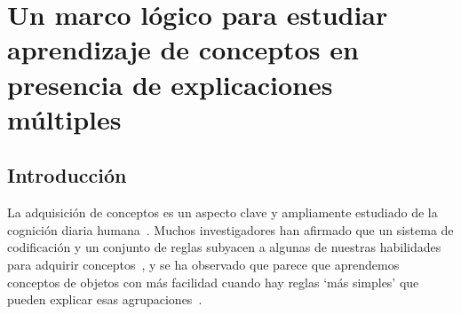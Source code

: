 

\chapter{Un marco lógico para estudiar aprendizaje de conceptos en presencia de explicaciones múltiples}\label{chapter:BRM}




\section{Introducción}


La adquisición de conceptos es un aspecto clave y ampliamente estudiado de la cognición diaria humana~\cite{cohen2005handbook, ashby2011human}. Muchos investigadores han afirmado que un sistema de codificación y un conjunto de reglas subyacen a algunas de nuestras habilidades para adquirir conceptos~\cite{nosofsky1994rule, tenenbaum2011grow, maddox1993comparing}, y se ha observado que parece que aprendemos conceptos de objetos con más facilidad cuando hay reglas `más simples' que pueden explicar esas agrupaciones~\cite{shepard1961learning, nosofsky1994comparing, rehder2005eyetracking, lewandowsky2011working, feldman2000minimization, blair2003easy, minda2001prototypes}.

